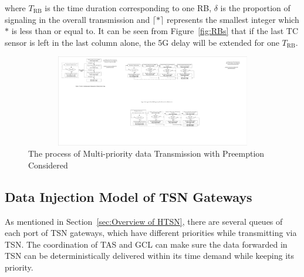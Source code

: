 \documentclass{SCIS2021}
\begin{document}
	\noindent where $T_\text{RB}$ is the time duration corresponding to one RB, $\delta$ is the proportion of signaling in the overall transmission and $\lceil*\rceil$ represents the smallest integer which $*$ is less than or equal to.
	It can be seen from Figure~\ref{fig:RBs} that if the last TC sensor is left in the last column alone, the 5G delay will be extended for one $T_\text{RB}$.


	\begin{figure}[h]
		\centering
		\includegraphics[height=4cm, width=16.2cm]{wireless_trans_mech}
		\caption{The process of Multi-priority data Transmission with Preemption Considered}
		\label{fig:process}
	\end{figure}

	\subsection{Data Injection Model of TSN Gateways}
	As mentioned in Section~\ref{sec:Overview of HTSN}, there are several queues of each port of TSN gateways, which have different priorities while transmitting via TSN. The coordination of TAS and GCL can make sure the data forwarded in TSN can be deterministically delivered within its time demand while keeping its priority.
\end{document}
